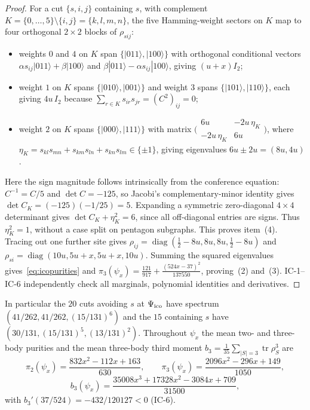 \begin{proof}
For a cut $\{s,i,j\}$ containing $s$, with complement $K=\{0,\dots,5\}\setminus\{i,j\}=\{k,l,m,n\}$, the five Hamming-weight sectors on $K$ map to four orthogonal $2\times2$ blocks of $\rho_{sij}$:
\begin{itemize}
\item weights $0$ and $4$ on $K$ span $\{|011\rangle,|100\rangle\}$ with orthogonal conditional vectors $\alpha s_{ij}|011\rangle+\beta|100\rangle$ and $\beta|011\rangle-\alpha s_{ij}|100\rangle$, giving $(u+x)I_2$;
\item weight $1$ on $K$ spans $\{|010\rangle,|001\rangle\}$ and weight $3$ spans $\{|101\rangle,|110\rangle\}$, each giving $4u\,I_2$ because $\sum_{r\in K}s_{ir}s_{jr}=(C^2)_{ij}=0$;
\item weight $2$ on $K$ spans $\{|000\rangle,|111\rangle\}$ with matrix $\bigl(\begin{smallmatrix}6u&-2u\,\eta_K\\-2u\,\eta_K&6u\end{smallmatrix}\bigr)$, where $\eta_K=s_{kl}s_{mn}+s_{km}s_{ln}+s_{kn}s_{lm}\in\{\pm1\}$, giving eigenvalues $6u\pm2u=(8u,4u)$.
\end{itemize}
Here the sign magnitude follows intrinsically from the conference equation:
$C^{-1}=C/5$ and $\det C=-125$, so Jacobi's complementary-minor identity gives
$\det C_K=(-125)(-1/25)=5$. Expanding a symmetric zero-diagonal $4\times4$
determinant gives $\det C_K+\eta_K^2=6$, since all off-diagonal entries are signs.
Thus $\eta_K^2=1$, without a case split on pentagon subgraphs.
This proves item~(4). Tracing out one further site gives $\rho_{ij}=\operatorname{diag}(\tfrac12-8u,8u,8u,\tfrac12-8u)$ and $\rho_{si}=\operatorname{diag}(10u,5u+x,5u+x,10u)$. Summing the squared eigenvalues gives~\eqref{eq:icopurities} and $\pi_3(\psi_x)=\frac{121}{917}+\frac{(524x-37)^2}{137550}$, proving~(2) and~(3).
IC-1--IC-6 independently check all marginals, polynomial identities and derivatives. \qedhere
\end{proof}

\noindent In particular the $20$ cuts avoiding $s$ at $\Psi_{\mathrm{ico}}$ have spectrum
$(41/262,41/262,(15/131)^{6})$ and the $15$ containing $s$ have $(30/131,(15/131)^{5},(13/131)^{2})$.
Throughout $\psi_x$ the mean two- and three-body purities and the mean three-body third moment
$b_3=\tfrac1{35}\sum_{|S|=3}\operatorname{tr}\rho_S^3$ are
\begin{equation}\label{eq:icopurities}
 \pi_2(\psi_x)=\frac{832x^2-112x+163}{630},\qquad
 \pi_3(\psi_x)=\frac{2096x^2-296x+149}{1050},
\end{equation}
\[
 b_3(\psi_x)=\frac{35008x^3+17328x^2-3084x+709}{31500},
\]
with $b_3'(37/524)=-432/120127<0$ (IC-6).

